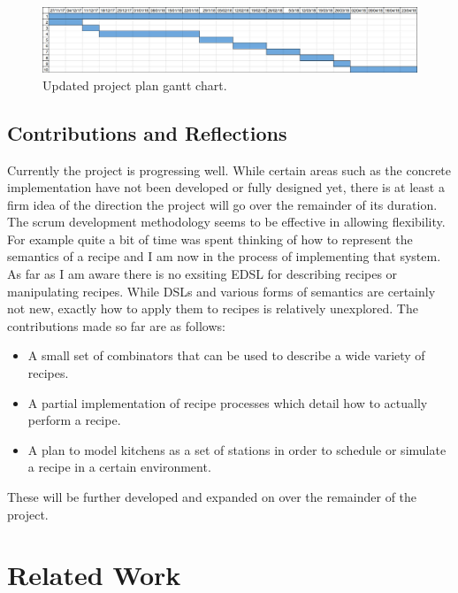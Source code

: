 \documentclass[11pt]{article}
\begin{document}
    \begin{figure}[ht]
        \centering
            \includegraphics[width=\textwidth,keepaspectratio]{gantt_chart2.jpg}
        \caption{Updated project plan gantt chart.}
    \end{figure}

    \subsection{Contributions and Reflections}

    Currently the project is progressing well. While certain areas such as the concrete implementation have
    not been developed or fully designed yet, there is at least a firm idea of the direction the project will go
    over the remainder of its duration. The scrum development methodology seems to be effective in allowing
    flexibility. For example quite a bit of time was spent thinking of how to represent the semantics of a
    recipe and I am now in the process of implementing that system. \\
    
    As far as I am aware there is no exsiting EDSL for describing recipes or manipulating recipes. While DSLs
    and various forms of semantics are certainly not new, exactly how to apply them to recipes is relatively
    unexplored. The contributions made so far are as follows:

    \begin{itemize}
        \item A small set of combinators that can be used to describe a wide variety of recipes.

        \item A partial implementation of recipe processes which detail how to actually perform a recipe.

        \item A plan to model kitchens as a set of stations in order to schedule or simulate a recipe
        in a certain environment.
    \end{itemize}

    These will be further developed and expanded on over the remainder of the project.

    \section{Related Work}
\end{document}
